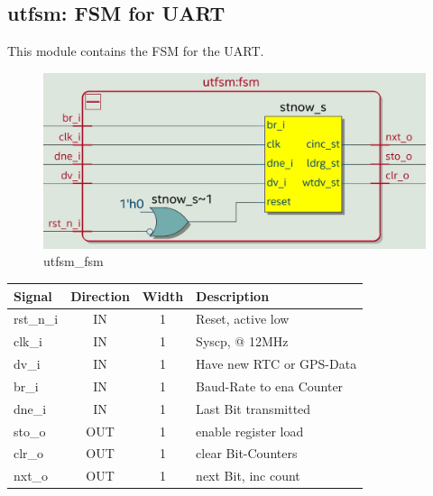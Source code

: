 \documentclass[12pt,a4 paper] {report}
\begin{document}
\subsection{utfsm: FSM for UART}
This module contains the FSM for the UART.
\begin{figure}[h]
	\centering	
	\includegraphics[scale=0.2]{../png/utfsm_fsm.png}
	\caption{utfsm\_fsm}
\end{figure}
\begin{center}
	\begin{tabular}{ | p{2cm} | c | c | p{5cm} |}
		\hline
		\textbf{Signal} & \textbf{Direction} & \textbf{Width} & \textbf{Description} \\
		\hline	
		rst\_n\_i & IN & 1 & Reset, active low \\
		\hline
		clk\_i & IN & 1 & Syscp, @ 12MHz \\
		\hline
		dv\_i  & IN & 1 & Have new RTC or GPS-Data \\
		\hline
		br\_i  & IN & 1 & Baud-Rate to ena Counter \\
		\hline
		dne\_i & IN & 1 & Last Bit transmitted \\
		\hline
		sto\_o & OUT & 1 & enable register load \\
		\hline
		clr\_o & OUT & 1 & clear Bit-Counters \\
		\hline
		nxt\_o & OUT & 1 & next Bit, inc count \\
		\hline
	\end{tabular}
\end{center}

\newpage
\end{document}
